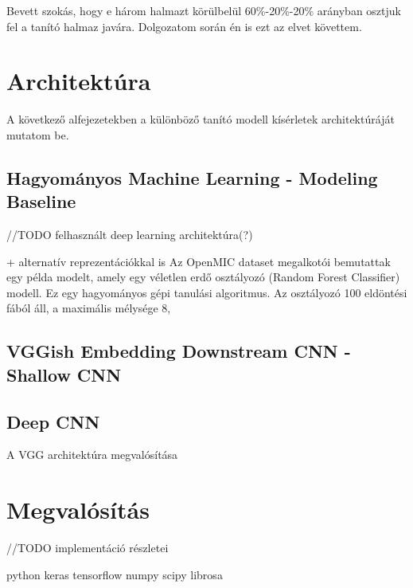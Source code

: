 Bevett szokás, hogy e három halmazt körülbelül 60\%-20\%-20\% arányban osztjuk fel a tanító halmaz javára. \cite{traintestvalid} Dolgozatom során én is ezt az elvet követtem.

\section{Architektúra}

A következő alfejezetekben a különböző tanító modell kísérletek architektúráját mutatom be.

\subsection{Hagyományos Machine Learning - Modeling Baseline}
//TODO felhasznált deep learning architektúra(?)

+ alternatív reprezentációkkal is
Az OpenMIC dataset megalkotói bemutattak egy példa modelt, amely egy véletlen erdő osztályozó (Random Forest Classifier) modell. Ez egy hagyományos gépi tanulási algoritmus. Az osztályozó 100 eldöntési fából áll, a maximális mélysége 8, 

\subsection{VGGish Embedding Downstream CNN - Shallow CNN}



\subsection{Deep CNN}

A VGG \cite{vgg} architektúra megvalósítása 


\section{Megvalósítás}

//TODO implementáció részletei

python keras tensorflow numpy scipy librosa 
